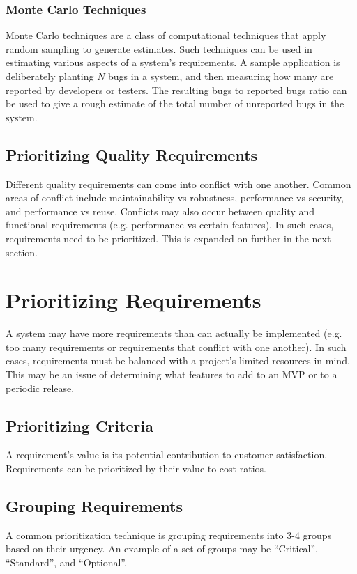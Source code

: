 \documentclass[12pt,titlepage]{article}
\let\stdsection\section
\renewcommand\section{\clearpage\stdsection}
\begin{document}
      \subsubsection{Monte Carlo Techniques}
        Monte Carlo techniques are a class of computational techniques that apply random sampling to generate estimates. Such techniques can be used in
        estimating various aspects of a system's requirements. A sample application is deliberately planting $N$ bugs in a system, and then measuring how
        many are reported by developers or testers. The resulting bugs to reported bugs ratio can be used to give a rough estimate of the total number of
        unreported bugs in the system.

    \subsection{Prioritizing Quality Requirements}
      Different quality requirements can come into conflict with one another. Common areas of conflict include maintainability vs robustness, performance
      vs security, and performance vs reuse. Conflicts may also occur between quality and functional requirements (e.g. performance vs certain features).
      In such cases, requirements need to be prioritized. This is expanded on further in the next section.

  \section{Prioritizing Requirements}
    A system may have more requirements than can actually be implemented (e.g. too many requirements or requirements that conflict with one another).
    In such cases, requirements must be balanced with a project's limited resources in mind. This may be an issue of determining what features to add
    to an MVP or to a periodic release.

    \subsection{Prioritizing Criteria}
      A requirement's value is its potential contribution to customer satisfaction. Requirements can be prioritized by their value to cost ratios.

    \subsection{Grouping Requirements}
      A common prioritization technique is grouping requirements into 3-4 groups based on their urgency. An example of a set of groups may be
      ``Critical'', ``Standard'', and ``Optional''.
\end{document}
